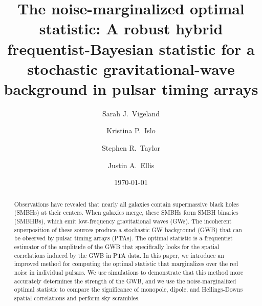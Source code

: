 \documentclass[twocolumn,aps,prd,superscriptaddress]{revtex4-1}
\begin{document}
\title{The noise-marginalized optimal statistic: A robust hybrid frequentist-Bayesian statistic for a stochastic gravitational-wave background in pulsar timing arrays}

\author{Sarah J.\ Vigeland}

\author{Kristina P.\ Islo}

\author{Stephen R.\ Taylor}

\author{Justin A.\ Ellis}


\date{\today}  

\begin{abstract}
Observations have revealed that nearly all galaxies 
contain supermassive black holes (SMBHs) at their centers. 
When galaxies merge, these SMBHs form SMBH binaries (SMBHBs), 
which emit low-frequency gravitational waves (GWs). 
The incoherent superposition of these sources produce a stochastic GW background (GWB) 
that can be observed by pulsar timing arrays (PTAs). 
The optimal statistic is a frequentist estimator of the amplitude of the GWB 
that specifically looks for the spatial correlations induced by the GWB in PTA data. 
In this paper, we introduce an improved method for computing the optimal statistic 
that marginalizes over the red noise in individual pulsars. 
We use simulations to demonstrate that this method 
more accurately determines the strength of the GWB, 
and we use the noise-marginalized optimal statistic 
to compare the significance of monopole, dipole, and Hellings-Downs spatial correlations 
and perform sky scrambles.
\end{abstract}
\end{document}
